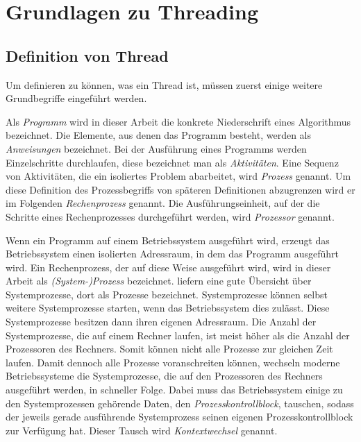 \section{Grundlagen zu Threading}


\subsection{Definition von Thread}
Um definieren zu können, was ein Thread ist, müssen zuerst einige weitere Grundbegriffe eingeführt werden. 

Als \emph{Programm} wird in dieser Arbeit die konkrete Niederschrift eines Algorithmus bezeichnet. Die Elemente, aus denen das Programm besteht, werden als \emph{Anweisungen} bezeichnet. Bei der Ausführung eines Programms werden Einzelschritte durchlaufen, diese bezeichnet man als \emph{Aktivitäten}. Eine Sequenz von Aktivitäten, die ein isoliertes Problem abarbeitet, wird \emph{Prozess} genannt. Um diese Definition des Prozessbegriffs von späteren Definitionen abzugrenzen wird er im Folgenden \emph{Rechenprozess} genannt. Die Ausführungseinheit, auf der die Schritte eines Rechenprozesses durchgeführt werden, wird \emph{Prozessor} genannt.\cite{Herrtwich1989}

Wenn ein Programm auf einem Betriebssystem ausgeführt wird, erzeugt das Betriebssystem einen isolierten Adressraum, in dem das Programm ausgeführt wird. Ein Rechenprozess, der auf diese Weise ausgeführt wird, wird in dieser Arbeit als \emph{(System-)Prozess} bezeichnet. \textcite[Kapitel~2]{Tanenbaum2016} liefern eine gute Übersicht über Systemprozesse, dort als Prozesse bezeichnet. Systemprozesse können selbst weitere Systemprozesse starten, wenn das Betriebssystem dies zulässt. Diese Systemprozesse besitzen dann ihren eigenen Adressraum. Die Anzahl der Systemprozesse, die auf einem Rechner laufen, ist meist höher als die Anzahl der Prozessoren des Rechners. Somit können nicht alle Prozesse zur gleichen Zeit laufen. Damit dennoch alle Prozesse voranschreiten können, wechseln moderne Betriebssysteme die Systemprozesse, die auf den Prozessoren des Rechners ausgeführt werden, in schneller Folge. Dabei muss das Betriebssystem einige zu den Systemprozessen gehörende Daten, den \emph{Prozesskontrollblock}, tauschen, sodass der jeweils gerade ausführende Systemprozess seinen eigenen Prozesskontrollblock zur Verfügung hat. Dieser Tausch wird \emph{Kontextwechsel} genannt.

